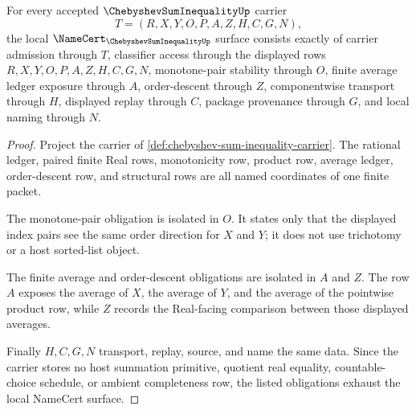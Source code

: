 \begin{theorem}
\label{thm:chebyshev-sum-inequality-namecert-obligations}
For every accepted $\ChebyshevSumInequalityUp$ carrier
$$
T=(R,X,Y,O,P,A,Z,H,C,G,N),
$$
the local $\NameCert_{\ChebyshevSumInequalityUp}$ surface consists exactly of carrier admission through $T$, classifier access through the displayed rows $R,X,Y,O,P,A,Z,H,C,G,N$, monotone-pair stability through $O$, finite average ledger exposure through $A$, order-descent through $Z$, componentwise transport through $H$, displayed replay through $C$, package provenance through $G$, and local naming through $N$.
\end{theorem}
\begin{proof}
Project the carrier of \autoref{def:chebyshev-sum-inequality-carrier}. The rational ledger, paired finite Real rows, monotonicity row, product row, average ledger, order-descent row, and structural rows are all named coordinates of one finite packet.

The monotone-pair obligation is isolated in $O$. It states only that the displayed index pairs see the same order direction for $X$ and $Y$; it does not use trichotomy or a host sorted-list object.

The finite average and order-descent obligations are isolated in $A$ and $Z$. The row $A$ exposes the average of $X$, the average of $Y$, and the average of the pointwise product row, while $Z$ records the Real-facing comparison between those displayed averages.

Finally $H,C,G,N$ transport, replay, source, and name the same data. Since the carrier stores no host summation primitive, quotient real equality, countable-choice schedule, or ambient completeness row, the listed obligations exhaust the local NameCert surface.
\end{proof}


